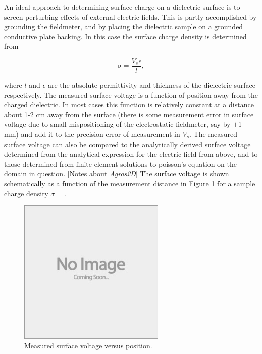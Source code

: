 \documentclass{jfm}
\begin{document}
An ideal approach to determining surface charge on a dielectric surface is to screen perturbing effects of external electric fields. This is partly accomplished by grounding the fieldmeter, and by placing the dielectric sample on a grounded conductive plate backing. In this case the surface charge density is determined from

\[ \sigma = \frac{V_s \epsilon}{l}, \]

where $l$ and $\epsilon$ are the absolute permittivity and thickness of the dielectric surface respectively. The measured surface voltage is a function of position away from the charged dielectric. In most cases this function is relatively constant at a distance about 1-2 cm away from the surface (there is some measurement error in surface voltage due to small mispositioning of the electrostatic fieldmeter, say by $\pm$1 mm) and add it to the precision error of measurement in $V_s$. The measured surface voltage can also be compared to the analytically derived surface voltage determined from the analytical expression for the electric field from above, and to those determined from finite element solutions to poisson's equation on the domain in question. [Notes about \emph{Agros2D}] The surface voltage is shown schematically as a function of the measurement distance in Figure \ref{fig:surface_voltage} for a sample charge density $\sigma = $.

\begin{figure}
  \centerline{\includegraphics[height=7cm,width=7cm]{e88_1_thumb.jpg}}
  \caption{Measured surface voltage versus position.}
\label{fig:surface_voltage}
\end{figure}
\end{document}
